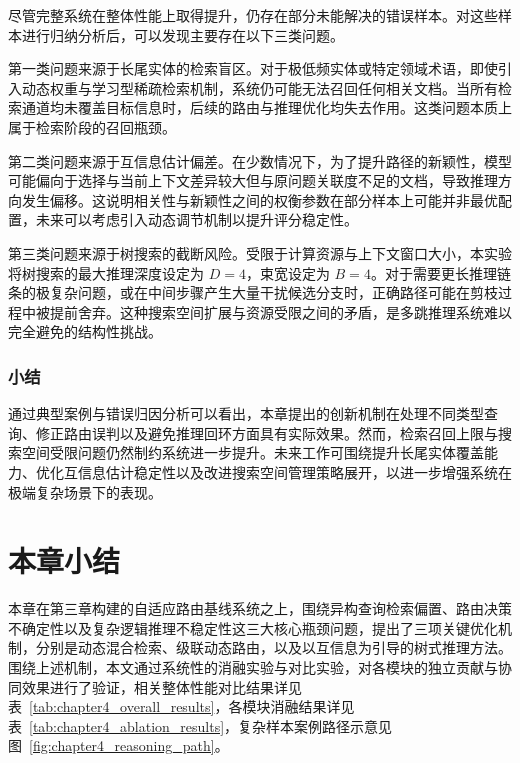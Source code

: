 尽管完整系统在整体性能上取得提升，仍存在部分未能解决的错误样本。对这些样本进行归纳分析后，可以发现主要存在以下三类问题。

第一类问题来源于长尾实体的检索盲区。对于极低频实体或特定领域术语，即使引入动态权重与学习型稀疏检索机制，系统仍可能无法召回任何相关文档。当所有检索通道均未覆盖目标信息时，后续的路由与推理优化均失去作用。这类问题本质上属于检索阶段的召回瓶颈。

第二类问题来源于互信息估计偏差。在少数情况下，为了提升路径的新颖性，模型可能偏向于选择与当前上下文差异较大但与原问题关联度不足的文档，导致推理方向发生偏移。这说明相关性与新颖性之间的权衡参数在部分样本上可能并非最优配置，未来可以考虑引入动态调节机制以提升评分稳定性。

第三类问题来源于树搜索的截断风险。受限于计算资源与上下文窗口大小，本实验将树搜索的最大推理深度设定为 $D=4$，束宽设定为 $B=4$。对于需要更长推理链条的极复杂问题，或在中间步骤产生大量干扰候选分支时，正确路径可能在剪枝过程中被提前舍弃。这种搜索空间扩展与资源受限之间的矛盾，是多跳推理系统难以完全避免的结构性挑战。

\subsubsection{小结}

通过典型案例与错误归因分析可以看出，本章提出的创新机制在处理不同类型查询、修正路由误判以及避免推理回环方面具有实际效果。然而，检索召回上限与搜索空间受限问题仍然制约系统进一步提升。未来工作可围绕提升长尾实体覆盖能力、优化互信息估计稳定性以及改进搜索空间管理策略展开，以进一步增强系统在极端复杂场景下的表现。


\section{本章小结}\label{sec:chap04_summary}

本章在第三章构建的自适应路由基线系统之上，围绕异构查询检索偏置、路由决策不确定性以及复杂逻辑推理不稳定性这三大核心瓶颈问题，提出了三项关键优化机制，分别是动态混合检索、级联动态路由，以及以互信息为引导的树式推理方法。围绕上述机制，本文通过系统性的消融实验与对比实验，对各模块的独立贡献与协同效果进行了验证，相关整体性能对比结果详见表~\ref{tab:chapter4_overall_results}，各模块消融结果详见表~\ref{tab:chapter4_ablation_results}，复杂样本案例路径示意见图~\ref{fig:chapter4_reasoning_path}。


